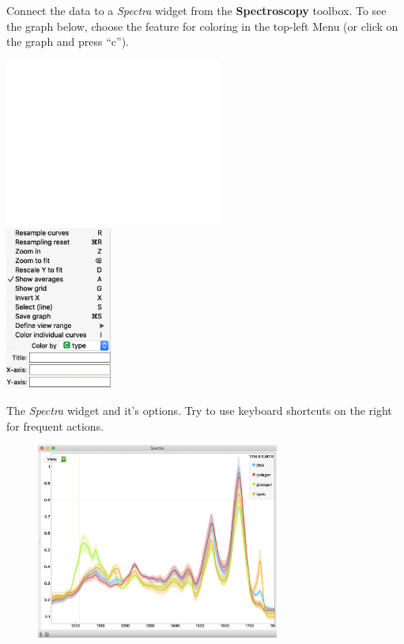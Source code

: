 Connect the data to a \textit{Spectra} widget from the \textbf{Spectroscopy} toolbox. To see the graph below, choose the feature for coloring in the top-left Menu (or click on the graph and press “c”).

\begin{marginfigure}
  \centering
  \includegraphics[height=55mm]{graphics/fig-spacer.png}\\
  \includegraphics[width=35mm]{spectral-data-fig4.png}%
  ~\vspace{0.5 cm}
  \caption{The \textit{Spectra} widget and it's options. Try to use keyboard shortcuts on the right for frequent actions.}
  \label{fig:spectral-data-fig4}
\end{marginfigure}

\begin{figure}[h]
  \centering
  \includegraphics[width=80mm]{spectral-data-fig3.png}%

  \label{fig:spectral-data-fig3}
\end{figure}
